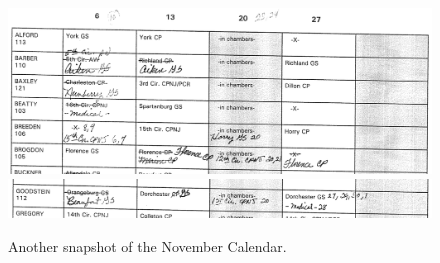 \documentclass[11pt, oneside]{article}   	%
\theoremstyle{ModifiedStyle}
\begin{document}
		\begin{figure}
			\centering
			\includegraphics[scale=0.42]{Figures/Fig3A}
			\includegraphics[scale=0.42]{Figures/Fig3B}
			\caption{Another snapshot of the November Calendar.}
			\label{Figure_Master_Calendar_3}
		\end{figure}

		\vspace{-3mm}
\end{document}
